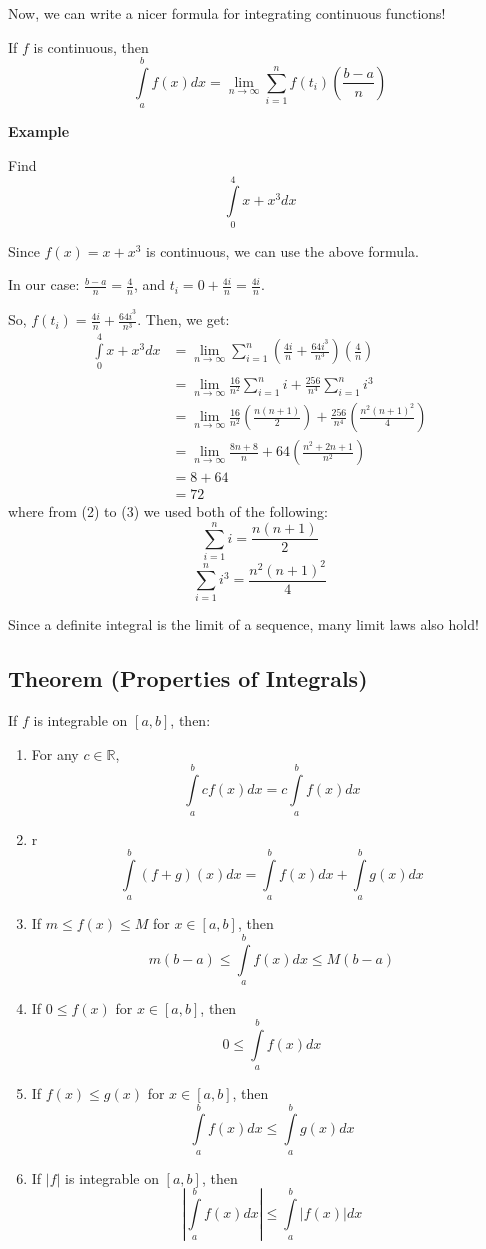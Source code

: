 Now, we can write a nicer formula for integrating continuous functions!

If $ f $ is continuous, then
\[ \int\limits_{a}^{b} f(x) d{x} = 
\lim\limits_{{n} \to {\infty}} \sum\limits_{i=1}^{n} f(t_i)\left(\frac{b-a}{n}\right) \]

\textbf{Example}

Find 
\[ \int\limits_{0}^{4} x+x^3 d{x} \]

Since $ f(x)=x+x^3 $ is continuous, we can use the above formula.

In our case: $ \frac{b-a}{n} = \frac{4}{n} $, and $ t_i = 0+\frac{4i}{n} = \frac{4i}{n} $.

So, $ f(t_i) = \frac{4i}{n} + \frac{64i^3}{n^3} $.
Then, we get:
\begin{align}
    \int\limits_{0}^{4} x+x^3 d{x} 
    &= \lim\limits_{{n} \to {\infty}} \sum\limits_{i=1}^{n}
        \left( \frac{4i}{n} +\frac{64i^3}{n^3} \right)\left( \frac{4}{n} \right)\\
    &= \lim\limits_{{n} \to {\infty}} \frac{16}{n^2} \sum\limits_{i=1}^{n} i +
        \frac{256}{n^4} \sum\limits_{i=1}^{n} i^3\\
    &= \lim\limits_{{n} \to {\infty}} \frac{16}{n^2} \left( \frac{n(n+1)}{2} \right) +
        \frac{256}{n^4} \left( \frac{n^2(n+1)^2}{4} \right)\\
    &= \lim\limits_{{n} \to {\infty}} \frac{8n+8}{n} +64 \left(\frac{n^2+2n+1}{n^2} \right)\\
    &= 8+64\\
    &=72
\end{align}
where from (2) to (3) we used both of the following:
\[ \sum\limits_{i=1}^{n} i=\frac{n(n+1)}{2} \]
\[ \sum\limits_{i=1}^{n} i^3=\frac{n^2(n+1)^2}{4} \]

Since a definite integral is the limit of a sequence, many limit laws also hold!

\subsection{Theorem (Properties of Integrals)}
If $ f $ is integrable on $ [a,b] $, then:
\begin{enumerate}[(1)]
    \item For any $ c\in\mathbb{R} $,
    \[ \int\limits_{a}^{b} cf(x) d{x} = c \int\limits_{a}^{b} f(x) d{x} \]
    \item r
    \[ \int\limits_{a}^{b} (f+g)(x) d{x} = \int\limits_{a}^{b} f(x) d{x} + 
                                            \int\limits_{a}^{b} g(x) d{x} \]
    \item If $ m\le f(x)\le M $ for $ x\in[a,b] $, then
    \[ m(b-a)\le \int\limits_{a}^{b} f(x) d{x} \le M(b-a) \]
    \item If $ 0\le f(x) $ for $ x\in[a,b] $, then
    \[ 0\le \int\limits_{a}^{b} f(x) d{x} \]
    \item If $ f(x)\le g(x) $ for $ x\in[a,b] $, then
    \[ \int\limits_{a}^{b} f(x) d{x} \le \int\limits_{a}^{b} g(x) d{x} \]
    \item If $ |f| $ is integrable on $ [a,b] $, then
    \[ \left|\int\limits_{a}^{b} f(x) d{x}\right|\le \int\limits_{a}^{b} |f(x)| d{x} \]
\end{enumerate}

